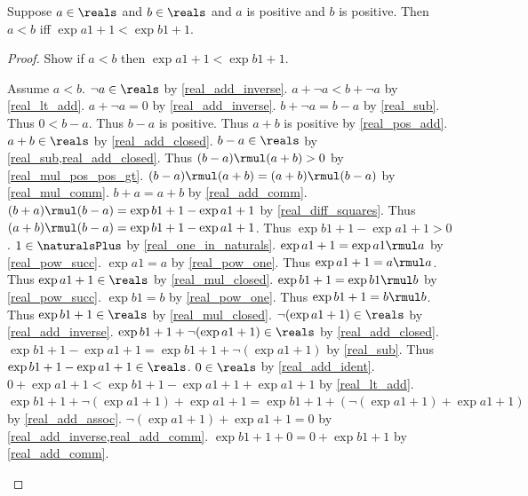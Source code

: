 \begin{theorem}\label{real_pos_lt_iff_sq_lt}
    Suppose $a\in\reals$ and $b\in\reals$ and $a$ is positive and $b$ is positive.
    Then $a < b$ iff $\exp{a}{1+1} < \exp{b}{1+1}$.
\end{theorem}
\begin{proof}
    Show if $a < b$ then $\exp{a}{1+1} < \exp{b}{1+1}$.
    \begin{subproof}
        Assume $a < b$.
        $\neg{a}\in\reals$ by \cref{real_add_inverse}.
        $a + \neg{a} < b + \neg{a}$ by \cref{real_lt_add}.
        $a + \neg{a} = 0$ by \cref{real_add_inverse}.
        $b + \neg{a} = b - a$ by \cref{real_sub}.
        Thus $0 < b - a$.
        Thus $b - a$ is positive.
        Thus $a + b$ is positive by \cref{real_pos_add}.
        $a + b\in\reals$ by \cref{real_add_closed}.
        $b - a\in\reals$ by \cref{real_sub,real_add_closed}.
        Thus $(b - a) \rmul (a + b) > 0$ by \cref{real_mul_pos_pos_gt}.
        $(b - a) \rmul (a + b) = (a + b) \rmul (b - a)$ by \cref{real_mul_comm}.
        $b + a = a + b$ by \cref{real_add_comm}.
        $(b + a) \rmul (b - a) = \exp{b}{1+1} - \exp{a}{1+1}$ by \cref{real_diff_squares}.
        Thus $(a + b) \rmul (b - a) = \exp{b}{1+1} - \exp{a}{1+1}$.
        Thus $\exp{b}{1+1} - \exp{a}{1+1} > 0$.
        $1\in\naturalsPlus$ by \cref{real_one_in_naturals}.
        $\exp{a}{1+1} = \exp{a}{1} \rmul a$ by \cref{real_pow_succ}.
        $\exp{a}{1} = a$ by \cref{real_pow_one}.
        Thus $\exp{a}{1+1} = a \rmul a$.
        Thus $\exp{a}{1+1}\in\reals$ by \cref{real_mul_closed}.
        $\exp{b}{1+1} = \exp{b}{1} \rmul b$ by \cref{real_pow_succ}.
        $\exp{b}{1} = b$ by \cref{real_pow_one}.
        Thus $\exp{b}{1+1} = b \rmul b$.
        Thus $\exp{b}{1+1}\in\reals$ by \cref{real_mul_closed}.
        $\neg{(\exp{a}{1+1})}\in\reals$ by \cref{real_add_inverse}.
        $\exp{b}{1+1} + \neg{(\exp{a}{1+1})}\in\reals$ by \cref{real_add_closed}.
        $\exp{b}{1+1} - \exp{a}{1+1} = \exp{b}{1+1} + \neg{(\exp{a}{1+1})}$ by \cref{real_sub}.
        Thus $\exp{b}{1+1} - \exp{a}{1+1}\in\reals$.
        $0\in\reals$ by \cref{real_add_ident}.
        $0 + \exp{a}{1+1} < \exp{b}{1+1} - \exp{a}{1+1} + \exp{a}{1+1}$ by \cref{real_lt_add}.
        $\exp{b}{1+1} + \neg{(\exp{a}{1+1})} + \exp{a}{1+1} = \exp{b}{1+1} + (\neg{(\exp{a}{1+1})} + \exp{a}{1+1})$ by \cref{real_add_assoc}.
        $\neg{(\exp{a}{1+1})} + \exp{a}{1+1} = 0$ by \cref{real_add_inverse,real_add_comm}.
        $\exp{b}{1+1} + 0 = 0 + \exp{b}{1+1}$ by \cref{real_add_comm}.

\end{subproof}
\end{proof}
